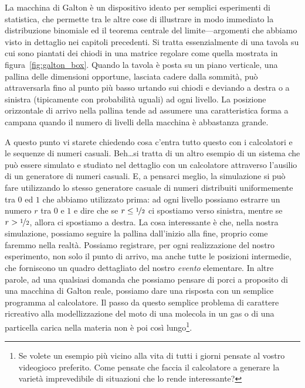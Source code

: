 La macchina di Galton è un dispositivo ideato per semplici esperimenti di
statistica, che permette tra le altre cose di illustrare in modo immediato la
distribuzione binomiale ed il teorema centrale del limite---argomenti che
abbiamo visto in dettaglio nei capitoli precedenti. Si tratta essenzialmente di
una tavola su cui sono piantati dei chiodi in una matrice regolare come quella
mostrata in figura~\ref{fig:galton_box}. Quando la tavola è posta su un piano
verticale, una pallina delle dimensioni opportune, lasciata cadere dalla
sommità, può attraversarla fino al punto più basso urtando sui chiodi
e deviando a destra o a sinistra (tipicamente con probabilità uguali) ad
ogni livello. La posizione orizzontale di arrivo nella pallina tende ad
assumere una caratteristica forma a campana quando il numero di livelli della
macchina è abbastanza grande.

\begin{figure}[htb]
\end{figure}

A questo punto vi starete chiedendo cosa c'entra tutto questo con i calcolatori
e le sequenze di numeri casuali. Beh\ldots si tratta di un altro esempio di un
sistema che può essere simulato e studiato nel dettaglio con un calcolatore
attraverso l'ausilio di un generatore di numeri casuali. E, a pensarci meglio,
la simulazione si può fare utilizzando lo stesso generatore casuale di
numeri distribuiti uniformemente tra $0$ ed $1$ che abbiamo utilizzato prima:
ad ogni livello possiamo estrarre un numero $r$ tra $0$ e $1$ e dire che se
$r \leq \nicefrac{1}{2}$ ci spostiamo verso sinistra, mentre se
$r > \nicefrac{1}{2}$, allora ci spostiamo a destra. La cosa interessante è
che, nella nostra simulazione, possiamo seguire la pallina dall'inizio alla
fine, proprio come faremmo nella realtà. Possiamo registrare, per ogni
realizzazione del nostro esperimento, non solo il punto di arrivo, ma anche
tutte le posizioni intermedie, che forniscono un quadro dettagliato del nostro
\emph{evento} elementare. In altre parole, ad una qualsiasi domanda che
possiamo pensare di porci a proposito di una macchina di Galton reale, possiamo
dare una risposta con un semplice programma al calcolatore. Il passo da questo
semplice problema di carattere ricreativo alla modellizzazione del moto di
una molecola in un gas o di una particella carica nella materia non è poi
così lungo\footnote{Se volete un esempio più vicino alla vita di tutti
  i giorni pensate al vostro videogioco preferito. Come pensate che faccia
  il calcolatore a generare la varietà imprevedibile di situazioni che lo
  rende interessante?}.

